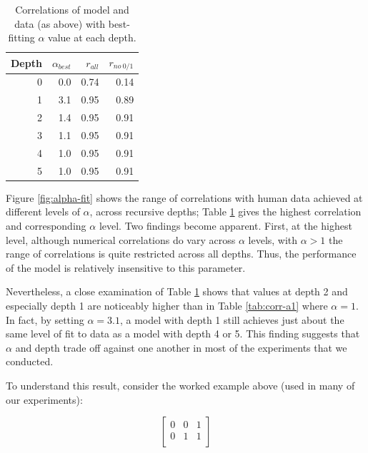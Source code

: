 \documentclass[man,noapacite]{apa2}
\begin{document}
\begin{table}[ht]
\centering
\begin{tabular}{rrrr}
  \hline
Depth & $\alpha_{best}$ & $r_{all}$ & $r_{no~0/1}$ \\
  \hline
  0 & 0.0 & 0.74 & 0.14 \\
    1 & 3.1 & 0.95 & 0.89 \\
    2 & 1.4 & 0.95 & 0.91 \\
    3 & 1.1 & 0.95 & 0.91 \\
    4 & 1.0 & 0.95 & 0.91 \\
    5 & 1.0 & 0.95 & 0.91 \\
   \hline
\end{tabular}
\caption{\label{tab:corrs-fita} Correlations of model and data (as above) with best-fitting $\alpha$ value at each depth.}
\end{table}

Figure \ref{fig:alpha-fit} shows the range of correlations with human data achieved at different levels of $\alpha$, across recursive depths; Table \ref{tab:corrs-fita} gives the highest correlation and corresponding $\alpha$ level. Two findings become apparent. First, at the highest level, although numerical correlations do vary across $\alpha$ levels, with $\alpha > 1$ the range of correlations is quite restricted across all depths. Thus, the performance of the model is relatively insensitive to this parameter.

Nevertheless, a close examination of Table \ref{tab:corrs-fita} shows that values at depth 2 and especially depth 1 are noticeably higher than in Table \ref{tab:corr-a1} where $\alpha=1$. In fact, by setting $\alpha=3.1$, a model with depth 1 still achieves just about the same level of fit to data as a model with depth 4 or 5. This finding suggests that $\alpha$ and depth trade off against one another in most of the experiments that we conducted.

To understand this result, consider the worked example above (used in many of our experiments):

\begin{equation}
\left[
    \begin{array}{ccc}
      0 & 0 & 1 \\
      0 & 1 & 1\\
    \end{array}
  \right]
\end{equation}
\end{document}
